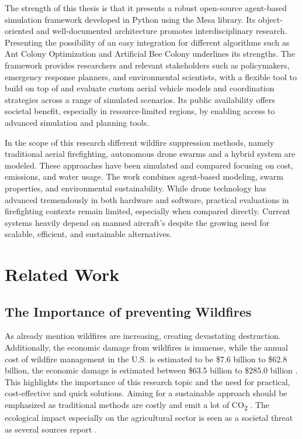 \documentclass[twoside]{article}
\begin{document}
The strength of this thesis is that it presents a robust open-source agent-based simulation framework developed in Python using the Mesa library. Its object-oriented and well-documented architecture promotes interdisciplinary research. Presenting the possibility of an easy integration for different algorithms such as Ant Colony Optimization and Artificial Bee Colony underlines its strengths. The framework provides researchers and relevant stakeholders such as policymakers, emergency response planners, and environmental scientists, with a flexible tool to build on top of and evaluate custom aerial vehicle models and coordination strategies across a range of simulated scenarios. Its public availability offers societal benefit, especially in resource-limited regions, by enabling access to advanced simulation and planning tools.


In the scope of this research different wildfire suppression methods, namely traditional aerial firefighting, autonomous drone swarms and a hybrid system are modeled. These approaches have been simulated and compared focusing on cost, emissions, and water usage. The work combines agent-based modeling, swarm properties, and environmental sustainability. While drone technology has advanced tremendously in both hardware and software, practical evaluations in firefighting contexts remain limited, especially when compared directly. Current systems heavily depend on manned aircraft's despite the growing need for scalable, efficient, and sustainable alternatives.


\section{Related Work}

\subsection{The Importance of preventing Wildfires}
As already mention wildfires are increasing, creating devastating destruction. Additionally, the economic damage from wildfires is immense, while the annual cost of wildfire management in the U.S. is estimated to be \$7.6 billion to \$62.8 billion, the economic damage is estimated between \$63.5 billion to \$285.0 billion \cite{Afghah2019}. This highlights the importance of this research topic and the need for practical, cost-effective and quick solutions. Aiming for a sustainable approach should be emphasized as traditional methods are costly and emit a lot of CO\textsubscript{2} \cite{Saffre2022}. The ecological impact especially on the agricultural sector is seen as a societal threat as several sources report \citep{grassland_Wildfires,IPCC2023}. 
\end{document}
